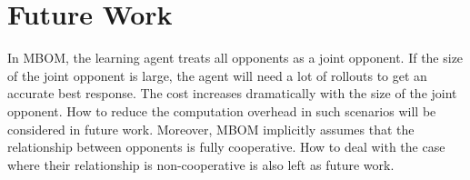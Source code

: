 \documentclass{article}
\begin{document}
\section{Future Work}
\label{app:future work}
In MBOM, the learning agent treats all opponents as a joint opponent. If the size of the joint opponent is large, the agent will need a lot of rollouts to get an accurate best response. The cost increases dramatically with the size of the joint opponent. How to reduce the computation overhead in such scenarios will be considered in future work. Moreover, MBOM implicitly assumes that the relationship between opponents is fully cooperative. How to deal with the case where their relationship is non-cooperative is also left as future work.

\end{document}
